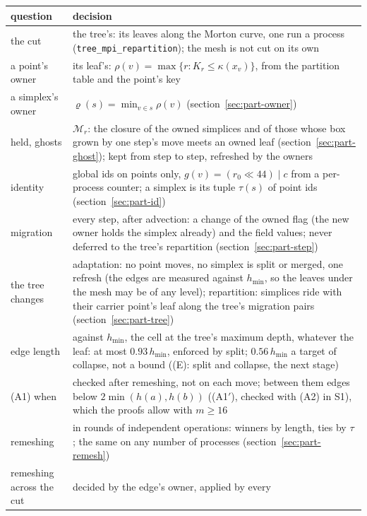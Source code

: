 \documentclass[10pt,a4paper]{article}
\theoremstyle{definition}
\newcommand{\fn}[1]{\texttt{#1}}
\begin{document}
\begin{center}
\small
\begin{tabularx}{\textwidth}{@{}>{\raggedright}p{}X@{}}
  \toprule
  question & decision \\
  \midrule
  the cut & the tree's: its leaves along the Morton curve, one run a
    process (\fn{tree\_mpi\_repartition}); the mesh is not cut on its own \\
  a point's owner & its leaf's: $\rho(v) = \max\{r : K_r \le
    \kappa(x_v)\}$, from the partition table and the point's key \\
  a simplex's owner & $\varrho(s) = \min_{v \in s} \rho(v)$
    (section~\ref{sec:part-owner}) \\
  held, ghosts & $\mathcal{M}_r$: the closure of the owned simplices and
    of those whose box grown by one step's move meets an owned leaf
    (section~\ref{sec:part-ghost}); kept from step to step, refreshed
    by the owners \\
  identity & global ids on points only, $g(v) = (r_0 \ll 44) \mid c$
    from a per-process counter; a simplex is its tuple $\tau(s)$ of point
    ids (section~\ref{sec:part-id}) \\
  migration & every step, after advection: a change of the owned flag
    (the new owner holds the simplex already) and the field values;
    never deferred to the tree's repartition (section~\ref{sec:part-step})
    \\
  the tree changes & adaptation: no point moves, no simplex is split or
    merged, one refresh (the edges are measured against $h_{\min}$, so the
    leaves under the mesh may be of any level); repartition: simplices
    ride with their carrier point's leaf along the tree's migration pairs
    (section~\ref{sec:part-tree}) \\
  edge length & against $h_{\min}$, the cell at the tree's maximum depth,
    whatever the leaf: at most $0.93\,h_{\min}$, enforced by split;
    $0.56\,h_{\min}$ a target of collapse, not a bound ((E): split and
    collapse, the next stage) \\
  (A1) when & checked after remeshing, not on each move; between them
    edges below $2\min(h(a), h(b))$ ((A1$'$), checked with (A2) in S1),
    which the proofs allow with $m \ge 16$ \\
  remeshing & in rounds of independent operations: winners by length,
    ties by $\tau$; the same on any number of processes
    (section~\ref{sec:part-remesh}) \\
  remeshing across the cut & decided by the edge's owner, applied by every

\end{tabularx}
\end{center}
\end{document}
